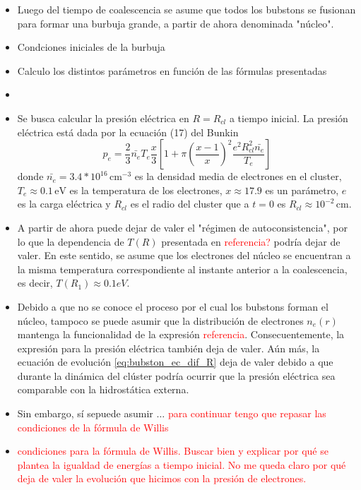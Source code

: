 \documentclass[aps,prb,twocolumn,superscriptaddress,floatfix,longbibliography,10pt]{revtex4-2}
\newcounter{para}
\begin{document}
\begin{itemize}
  \item Luego del tiempo de coalescencia se asume que todos los bubstons se fusionan para formar una burbuja grande, a partir de ahora denominada "núcleo".
  \item Condciones iniciales de la burbuja
  \item Calculo los distintos parámetros en función de las fórmulas presentadas
  \item 
  \item Se busca calcular la presión eléctrica en $R = R_{cl}$ a tiempo inicial. La presión eléctrica está dada por la ecuación (17) del Bunkin
  \[p_{e} = \frac{2}{3}\bar{n_e} T_e \frac{x}{3} \left [1 + \pi \left ( \frac{x-1}{x} \right )^2 \frac{e^2R_{cl}^2\bar{n_e}}{T_e}   \right ] \]
  donde $\bar{n_e} = 3.4 *10^{16} \, \mathrm{cm}^{-3}$ es la densidad media de electrones en el cluster, $T_e \approx 0.1 \, \mathrm{eV}$ es la temperatura de los electrones, $x \approx 17.9$ es un parámetro, $e$ es la carga eléctrica y $R_{cl}$ es el radio del cluster que a $t=0$ es $R_{cl} \approx 10^{-2} \, \mathrm{cm}$.  

  \item A partir de ahora puede dejar de valer el "régimen de autoconsistencia", por lo que la dependencia de $T(R)$ presentada en \textcolor{red}{referencia?} podría dejar de valer. En este sentido, se asume que los electrones del núcleo se encuentran a la misma temperatura correspondiente al instante anterior a la coalescencia, es decir, $T(R_1) \approx 0.1 eV$.



  \item Debido a que no se conoce el proceso por el cual los bubstons forman el núcleo, tampoco se puede asumir que la distribución de electrones $n_e(r)$ mantenga la funcionalidad de la expresión \textcolor{red}{referencia}. Consecuentemente, la expresión para la presión eléctrica también deja de valer. Aún más, la ecuación de evolución \ref{eq:bubston_ec_dif_R} deja de valer debido a que durante la dinámica del clúster podría ocurrir que la presión eléctrica sea comparable con la hidrostática externa. 

  \item Sin embargo, sí sepuede asumir $\dots$ \textcolor{red}{para continuar tengo que repasar las condiciones de la fórmula de Willis}
  \item \textcolor{red}{condiciones para la fórmula de Willis. Buscar bien y explicar por qué se plantea la igualdad de energías a tiempo inicial. No me queda claro por qué deja de valer la evolución que hicimos con la presión de electrones.}


\end{itemize}
\end{document}
